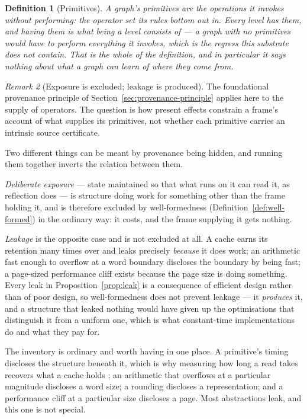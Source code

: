 \documentclass[11pt,a4paper]{article}
\newtheorem{definition}{Definition}[section]
\theoremstyle{remark}\newtheorem{remark}[definition]{Remark}
\begin{document}
\begin{definition}[Primitives]\label{def:primitives}
A graph's \emph{primitives} are the operations it invokes without performing: the operator set its
rules bottom out in. Every level has them, and having them is what being a level consists of --- a
graph with no primitives would have to perform everything it invokes, which is the regress this
substrate does not contain. That is the whole of the definition, and in particular it says nothing
about what a graph can learn of where they come from.
\end{definition}

\begin{remark}[Exposure is excluded; leakage is produced]\label{rem:exposure-leakage}
The foundational provenance principle of
Section~\ref{sec:provenance-principle} applies here to the supply of operators.
The question is how present effects constrain a frame's account of what
supplies its primitives, not whether each primitive carries an intrinsic
source certificate.

Two different things can be meant by provenance being hidden, and running them together inverts the
relation between them.

\emph{Deliberate exposure} --- state maintained so that what runs on it can read it, as reflection
does --- is structure doing work for something other than the frame holding it, and is therefore
excluded by well-formedness (Definition~\ref{def:well-formed}) in the ordinary way: it costs, and the
frame supplying it gets nothing.

\emph{Leakage} is the opposite case and is not excluded at all. A cache earns its retention many
times over and leaks precisely \emph{because} it does work; an arithmetic fast enough to overflow at
a word boundary discloses the boundary by being fast; a page-sized performance cliff exists because
the page size is doing something. Every leak in Proposition~\ref{prop:leak} is a consequence of
efficient design rather than of poor design, so well-formedness does not prevent leakage --- it
\emph{produces} it, and a structure that leaked nothing would have given up the optimisations that
distinguish it from a uniform one, which is what constant-time implementations do and what they pay
for.

The inventory is ordinary and worth having in one place. A primitive's timing discloses the structure
beneath it, which is why measuring how long a read takes recovers what a cache holds
\citep{osvik2006,kocher2019}; an arithmetic that overflows at a particular magnitude discloses a word
size; a rounding discloses a representation; and a performance cliff at a particular size discloses a
page. Most abstractions leak, and this one is not special.


\end{remark}
\end{document}

